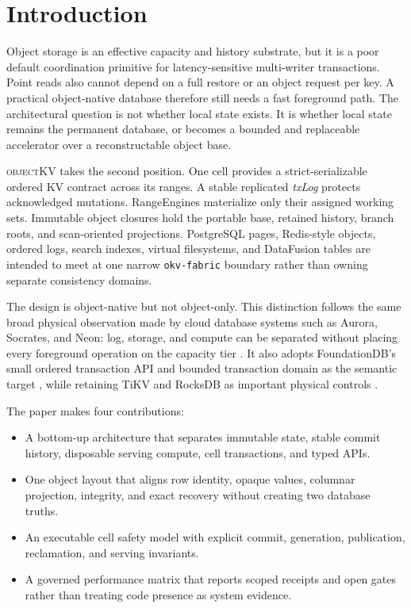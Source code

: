\documentclass[sigconf,nonacm]{acmart}
\newcommand{\okv}{\textsc{objectKV}}
\newcommand{\txlog}{\textit{txLog}}
\begin{document}
\maketitle
\vldbtopmatter

\section{Introduction}

Object storage is an effective capacity and history substrate, but it is a
poor default coordination primitive for latency-sensitive multi-writer
transactions. Point reads also cannot depend on a full restore or an object
request per key. A practical object-native database therefore still needs a
fast foreground path. The architectural question is not whether local state
exists. It is whether local state remains the permanent database, or becomes a
bounded and replaceable accelerator over a reconstructable object base.

\okv{} takes the second position. One cell provides a strict-serializable
ordered KV contract across its ranges. A stable replicated \txlog{} protects
acknowledged mutations. RangeEngines materialize only their assigned working
sets. Immutable object closures hold the portable base, retained history,
branch roots, and scan-oriented projections. PostgreSQL pages, Redis-style
objects, ordered logs, search indexes, virtual filesystems, and DataFusion
tables are intended to meet at one narrow \texttt{okv-fabric} boundary rather
than owning separate consistency domains.

The design is object-native but not object-only. This distinction follows the
same broad physical observation made by cloud database systems such as Aurora,
Socrates, and Neon: log, storage, and compute can be separated without placing
every foreground operation on the capacity tier
\cite{aurora2017,socrates2019,neon2022}. It also adopts FoundationDB's small
ordered transaction API and bounded transaction domain as the semantic target
\cite{fdb2021}, while retaining TiKV and RocksDB as important physical controls
\cite{tidb2020,rocksdb2016}.

The paper makes four contributions:

\begin{itemize}
  \item A bottom-up architecture that separates immutable state, stable commit
  history, disposable serving compute, cell transactions, and typed APIs.
  \item One object layout that aligns row identity, opaque values, columnar
  projection, integrity, and exact recovery without creating two database
  truths.
  \item An executable cell safety model with explicit commit, generation,
  publication, reclamation, and serving invariants.
  \item A governed performance matrix that reports scoped receipts and open
  gates rather than treating code presence as system evidence.
\end{itemize}
\end{document}
